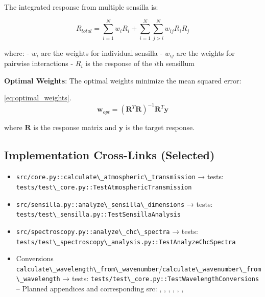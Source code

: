 \documentclass[
  13pt,
  a4paperpaper,
  12pt]{article}
\newcommand{\passthrough}[1]{#1}
\providecommand{\tightlist}{%
  \setlength{\itemsep}{0pt}\setlength{\parskip}{0pt}}
\begin{document}
The integrated response from multiple sensilla is:

\begin{equation}
R_{total} = \sum_{i=1}^{N} w_i R_i + \sum_{i=1}^{N} \sum_{j>i}^{N} w_{ij} R_i R_j \label{eq:integrated_response}
\end{equation}

where: - \(w_i\) are the weights for individual sensilla - \(w_{ij}\)
are the weights for pairwise interactions - \(R_i\) is the response of
the \(i\)th sensillum

\textbf{Optimal Weights}: The optimal weights minimize the mean squared
error:

\eqref{eq:optimal_weights}. \begin{equation}
\mathbf{w}_{opt} = (\mathbf{R}^T \mathbf{R})^{-1} \mathbf{R}^T \mathbf{y} \label{eq:optimal_weights}
\end{equation}

where \(\mathbf{R}\) is the response matrix and \(\mathbf{y}\) is the
target response.

\subsection{Implementation Cross-Links
(Selected)}\label{implementation-cross-links-selected}

\begin{itemize}
\tightlist
\item
  \passthrough{\lstinline!src/core.py::calculate\_atmospheric\_transmission!}
  → tests:
  \passthrough{\lstinline!tests/test\_core.py::TestAtmosphericTransmission!}
\item
  \passthrough{\lstinline!src/sensilla.py::analyze\_sensilla\_dimensions!}
  → tests:
  \passthrough{\lstinline!tests/test\_sensilla.py::TestSensillaAnalysis!}
\item
  \passthrough{\lstinline!src/spectroscopy.py::analyze\_chc\_spectra!} →
  tests:
  \passthrough{\lstinline!tests/test\_spectroscopy\_analysis.py::TestAnalyzeChcSpectra!}
\item
  Conversions
  \passthrough{\lstinline!calculate\_wavelength\_from\_wavenumber!}/\passthrough{\lstinline!calculate\_wavenumber\_from\_wavelength!}
  → tests:
  \passthrough{\lstinline!tests/test\_core.py::TestWavelengthConversions!}
  -- Planned appendices and corresponding src:
  , ,
  , ,
  , ,
\end{itemize}
\end{document}
